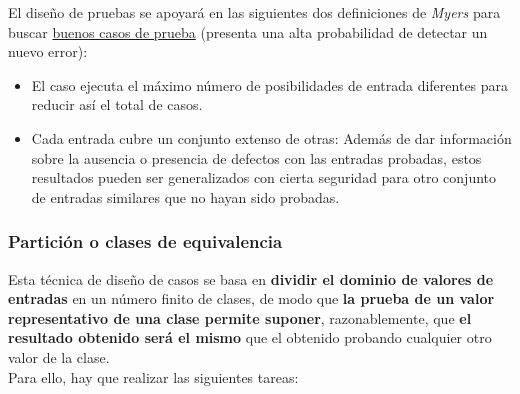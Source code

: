 El diseño de pruebas se apoyará en las siguientes dos definiciones de \textit{Myers} para buscar \uline{buenos casos de prueba} (presenta una alta probabilidad de detectar un nuevo error):

\begin{itemize}
    \item El caso ejecuta el máximo número de posibilidades de entrada diferentes para reducir así el total de casos.
    \item Cada entrada cubre un conjunto extenso de otras: Además de dar información sobre la ausencia o presencia de defectos con las entradas probadas, estos resultados pueden ser generalizados con cierta seguridad para otro conjunto de entradas similares que no hayan sido probadas.
\end{itemize}

\subsubsection{Partición o clases de equivalencia}

Esta técnica de diseño de casos se basa en \textbf{dividir el dominio de valores de entradas} en un número finito de clases, de modo que \textbf{la prueba de un valor representativo de una clase permite suponer}, razonablemente, que \textbf{el resultado obtenido será el mismo} que el obtenido probando cualquier otro valor de la clase.\\

Para ello, hay que realizar las siguientes tareas:

